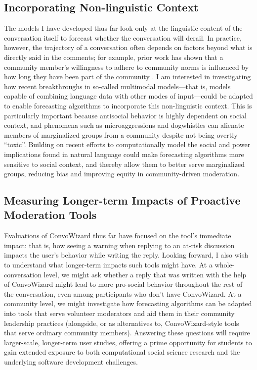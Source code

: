 \documentclass[12pt,letterpaper]{article}
\begin{document}
\subsection{Incorporating Non-linguistic Context}
The models I have developed thus far look only at the linguistic content of the conversation itself to forecast whether the conversation will derail.
In practice, however, the trajectory of a conversation often depends on factors beyond what is directly said in the comments; for example, prior work has shown that a community member's willingness to adhere to community norms is influenced by how long they have been part of the community \cite{danescu-niculescu-mizil_no_2013}.
I am interested in investigating how recent breakthroughs in so-called multimodal models---that is, models capable of combining language data with other modes of input---could be adapted to enable forecasting algorithms to incorporate this non-linguistic context.
This is particularly important because antisocial behavior is highly dependent on social context, and phenomena such as microaggressions and dogwhistles can alienate members of marginalized groups from a community despite not being overtly ``toxic''.
Building on recent efforts to computationally model the social and power implications found in natural language \cite{sap_social_2020} could make forecasting algorithms more sensitive to social context, and thereby allow them to better serve marginalized groups, reducing bias and improving equity in community-driven moderation.


\subsection{Measuring Longer-term Impacts of Proactive Moderation Tools}
Evaluations of ConvoWizard thus far have focused on the tool's immediate impact: that is, how seeing a warning when replying to an at-risk discussion impacts the user's behavior while writing the reply.
Looking forward, I also wish to understand what longer-term impacts such tools might have.
At a whole-conversation level, we might ask whether a reply that was written with the help of ConvoWizard might lead to more pro-social behavior throughout the rest of the conversation, even among participants who don't have ConvoWizard.
At a community level, we might investigate how forecasting algorithms can be adapted into tools that serve volunteer moderators and aid them in their community leadership practices (alongside, or as alternatives to, ConvoWizard-style tools that serve ordinary community members).
Answering these questions will require larger-scale, longer-term user studies, offering a prime opportunity for students to gain extended exposure to both computational social science research and the underlying software development challenges.
\end{document}
